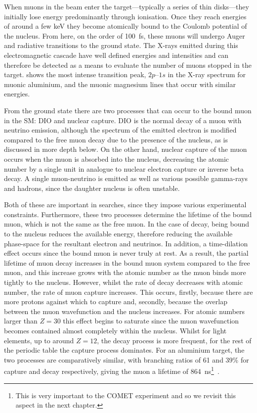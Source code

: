 When muons in the beam enter the target---typically a series of thin disks---they initially lose energy predominantly through ionisation.
Once they reach energies of around a few keV they become atomically bound to the Coulomb potential of the nucleus.
From here, on the order of 100~fs, these muons will undergo Auger and radiative transitions to the ground state.
The X-rays emitted during this electromagnetic cascade have well defined energies and intensities and can therefore be detected as a means to evaluate the number of muons stopped in the target.
 shows the most intense transition peak, $2p$--$1s$ in the X-ray spectrum for muonic aluminium, and the muonic magnesium lines that occur with similar energies.

\FigMuonicXrays
From the ground state there are two processes that can occur to the bound muon in the \ac{SM}:
\acf{DIO} and nuclear capture.
\ac{DIO} is the normal decay of a muon with neutrino emission, although the spectrum of the emitted electron is modified compared to the free muon decay due to the presence of the nucleus, as is discussed in more depth below.
On the other hand, nuclear capture of the muon occurs when the muon is absorbed into the nucleus, decreasing the atomic number by a single unit in analogue to nuclear electron capture or inverse beta decay.
A single muon-neutrino is emitted as well as various possible gamma-rays and hadrons, since the daughter nucleus is often unstable.

Both of these are important in \mueconv searches, since they impose various experimental constraints.
Furthermore, these two processes determine the lifetime of the bound muon, which is not the same as the free muon.
In the case of decay, being bound to the nucleus reduces the available energy, therefore reducing the available phase-space for the resultant electron and neutrinos. 
In addition, a time-dilation effect occurs since the bound muon is never truly at rest. 
As a result, the partial lifetime of muon decay increases in the bound muon system compared to the free muon, and this increase grows with the atomic number as the muon binds more tightly to the nucleus.
However, whilst the rate of decay decreases with atomic number, the rate of muon capture increases.
This occurs, firstly, because there are more protons against which to capture and, secondly, because the overlap between the muon wavefunction and the nucleus increases.
For atomic numbers larger than $Z=30$ this effect begins to saturate since the muon wavefunction becomes contained almost completely within the nucleus.
Whilst for light elements, up to around $Z=12$, the decay process is more frequent, for the rest of the periodic table the capture process dominates.
For an aluminium target, the two processes are comparatively similar, with branching ratios of 61 and 39\% for capture and decay respectively, giving the muon a lifetime of 864~ns\footnote{
This is very important to the COMET experiment and so we revisit this aspect in the next chapter.%
}~\cite{Measday2007Comparison}.

